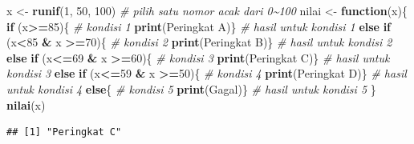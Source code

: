 \documentclass[
]{book}
\newenvironment{Shaded}{\begin{snugshade}}{\end{snugshade}}
\newcommand{\CommentTok}[1]{\textcolor[rgb]{0.56,0.35,0.01}{\textit{#1}}}
\newcommand{\ControlFlowTok}[1]{\textcolor[rgb]{0.13,0.29,0.53}{\textbf{#1}}}
\newcommand{\DecValTok}[1]{\textcolor[rgb]{0.00,0.00,0.81}{#1}}
\newcommand{\FunctionTok}[1]{\textcolor[rgb]{0.13,0.29,0.53}{\textbf{#1}}}
\newcommand{\NormalTok}[1]{#1}
\newcommand{\OtherTok}[1]{\textcolor[rgb]{0.56,0.35,0.01}{#1}}
\newcommand{\SpecialCharTok}[1]{\textcolor[rgb]{0.81,0.36,0.00}{\textbf{#1}}}
\newcommand{\StringTok}[1]{\textcolor[rgb]{0.31,0.60,0.02}{#1}}
\begin{document}
\begin{Shaded}
\begin{Highlighting}[]
\NormalTok{x }\OtherTok{\textless{}{-}} \FunctionTok{runif}\NormalTok{(}\DecValTok{1}\NormalTok{, }\DecValTok{50}\NormalTok{, }\DecValTok{100}\NormalTok{)                      }\CommentTok{\# pilih satu nomor acak dari 0\textasciitilde{}100}
\NormalTok{nilai }\OtherTok{\textless{}{-}} \ControlFlowTok{function}\NormalTok{(x)\{}
            \ControlFlowTok{if}\NormalTok{ (x}\SpecialCharTok{\textgreater{}=}\DecValTok{85}\NormalTok{)\{                     }\CommentTok{\# kondisi 1}
              \FunctionTok{print}\NormalTok{(}\StringTok{\textquotesingle{}Peringkat A\textquotesingle{}}\NormalTok{)\}         }\CommentTok{\# hasil untuk kondisi 1 }
            \ControlFlowTok{else} \ControlFlowTok{if}\NormalTok{ (x}\SpecialCharTok{\textless{}}\DecValTok{85} \SpecialCharTok{\&}\NormalTok{ x }\SpecialCharTok{\textgreater{}=}\DecValTok{70}\NormalTok{)\{        }\CommentTok{\# kondisi 2 }
              \FunctionTok{print}\NormalTok{(}\StringTok{\textquotesingle{}Peringkat B\textquotesingle{}}\NormalTok{)\}         }\CommentTok{\# hasil untuk kondisi 2}
            \ControlFlowTok{else} \ControlFlowTok{if}\NormalTok{ (x}\SpecialCharTok{\textless{}=}\DecValTok{69} \SpecialCharTok{\&}\NormalTok{ x }\SpecialCharTok{\textgreater{}=}\DecValTok{60}\NormalTok{)\{       }\CommentTok{\# kondisi 3 }
              \FunctionTok{print}\NormalTok{(}\StringTok{\textquotesingle{}Peringkat C\textquotesingle{}}\NormalTok{)\}         }\CommentTok{\# hasil untuk kondisi 3}
            \ControlFlowTok{else} \ControlFlowTok{if}\NormalTok{ (x}\SpecialCharTok{\textless{}=}\DecValTok{59} \SpecialCharTok{\&}\NormalTok{ x }\SpecialCharTok{\textgreater{}=}\DecValTok{50}\NormalTok{)\{       }\CommentTok{\# kondisi 4 }
              \FunctionTok{print}\NormalTok{(}\StringTok{\textquotesingle{}Peringkat D\textquotesingle{}}\NormalTok{)\}         }\CommentTok{\# hasil untuk kondisi 4}
            \ControlFlowTok{else}\NormalTok{\{                           }\CommentTok{\# kondisi 5}
              \FunctionTok{print}\NormalTok{(}\StringTok{\textquotesingle{}Gagal\textquotesingle{}}\NormalTok{)\}               }\CommentTok{\# hasil untuk kondisi 5}
\NormalTok{\}}
\FunctionTok{nilai}\NormalTok{(x)}
\end{Highlighting}
\end{Shaded}

\begin{verbatim}
## [1] "Peringkat C"
\end{verbatim}
\end{document}
